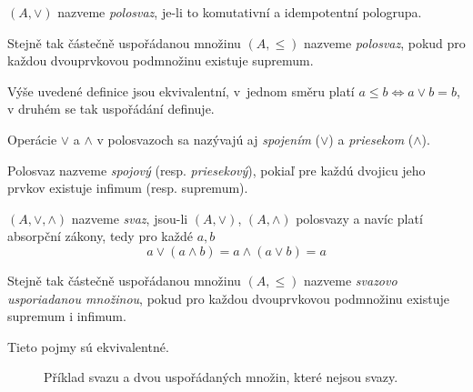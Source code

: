 \begin{definition}[Polosvaz]
    $(A, \vee)$ nazveme {\em polosvaz}, je-li to komutativní a
    idempotentní pologrupa.

    Stejně tak částečně uspořádanou množinu $(A, \leq)$ nazveme
    {\em polosvaz}, pokud pro každou dvouprvkovou podmnožinu existuje supremum.
\end{definition}

Výše uvedené definice jsou ekvivalentní, v~jednom směru platí
$a \leq b \iff a \vee b = b$, v druhém se tak uspořádání definuje.

Operácie $\vee$ a $\wedge$ v polosvazoch sa nazývajú aj 
{\em spojením} ($\vee$) a {\em priesekom} ($\wedge$).

\begin{definition}
    Polosvaz nazveme {\em spojový} (resp. {\em priesekový}), 
	pokiaľ pre každú dvojicu jeho prvkov existuje infimum (resp. supremum).
\end{definition}

\begin{definition}[Svaz]
    $(A, \vee, \wedge)$ nazveme {\em svaz}, jsou-li
    $(A, \vee)$, $(A, \wedge)$ polosvazy a navíc platí absorpční zákony,
    tedy pro každé $a, b$
    \[ a \vee (a \wedge b) = a \wedge (a \vee b) = a \]

    Stejně tak částečně uspořádanou množinu $(A, \leq)$ nazveme
    {\em svazovo usporiadanou množinou}, pokud pro každou dvouprvkovou
	podmnožinu existuje supremum i infimum. 
\end{definition}

Tieto pojmy sú ekvivalentné.

\begin{figure}[h!]
\centering
{}
\hspace{10pt}
\hspace{10pt}
\caption{
Příklad svazu a dvou uspořádaných množin, které nejsou svazy.}
\end{figure}

